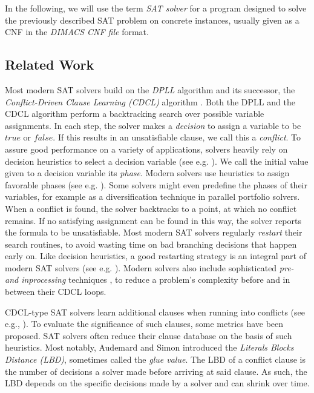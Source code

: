 \documentclass[12pt,a4paper,twoside]{scrartcl}
\numberwithin{equation}{section}
\begin{document}
In the following, we will use the term \textit{SAT solver} for a program designed to solve the previously described SAT problem on concrete instances, usually given as a CNF in the \textit{DIMACS CNF file} format.

\subsection{Related Work}
\label{sec:relatedWork}

Most modern SAT solvers build on the \textit{DPLL} \cite{dpllPaper} algorithm and its successor, the \textit{Conflict-Driven Clause Learning (CDCL)} algorithm \cite{cdclSolvers}. Both the DPLL and the CDCL algorithm perform a backtracking search over possible variable assignments. In each step, the solver makes a \textit{decision} to assign a variable to be $true$ or $false$. If this results in an unsatisfiable clause, we call this a \textit{conflict}. To assure good performance on a variety of applications, solvers heavily rely on decision heuristics to select a decision variable (see e.g. \cite{biere2015evaluating, moskewicz2001chaff, biere2008adaptive}). We call the initial value given to a decision variable its \textit{phase}. Modern solvers use heuristics to assign favorable phases (see e.g. \cite{componentPhases, cai2022better}). Some solvers might even predefine the phases of their variables, for example as a diversification technique in parallel portfolio solvers.
When a conflict is found, the solver backtracks to a point, at which no conflict remains. If no satisfying assignment can be found in this way, the solver reports the formula to be unsatisfiable. Most modern SAT solvers regularly \textit{restart} their search routines, to avoid wasting time on bad branching decisions that happen early on. Like decision heuristics, a good restarting strategy is an integral part of modern SAT solvers (see e.g. \cite{gomes1998boosting, gomes2000heavy, oh2015between}). Modern solvers also include sophisticated \textit{pre- and inprocessing} techniques \cite{biere2021preprocessing}, to reduce a problem's complexity before and in between their CDCL loops.

CDCL-type SAT solvers learn additional clauses when running into conflicts (see e.g., \cite{silva1996grasp, beame2003understanding, allUIPclauselearning, allUIPclauselearningBetter}). To evaluate the significance of such clauses, some metrics have been proposed. SAT solvers often reduce their clause database on the basis of such heuristics. Most notably, Audemard and Simon \cite{lbdPaper} introduced the \textit{Literals Blocks Distance (LBD)}, sometimes called the \textit{glue value}. The LBD of a conflict clause is the number of decisions a solver made before arriving at said clause. As such, the LBD depends on the specific decisions made by a solver and can shrink over time.
\end{document}
